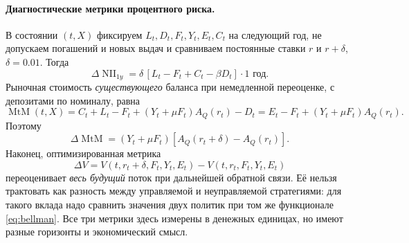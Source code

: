 \documentclass[11pt,a4paper]{article}
\newcommand{\MtM}{\operatorname{MtM}}
\newcommand{\NII}{\operatorname{NII}}
\begin{document}
\paragraph{Диагностические метрики процентного риска.}
В состоянии $(t,X)$ фиксируем $L_t,D_t,F_t,Y_t,E_t,C_t$
на следующий год, не допускаем погашений и новых выдач и
сравниваем постоянные ставки $r$ и $r+\delta$,
$\delta=0.01$. Тогда
\begin{equation}
 \Delta\NII_{1y}
 =\delta\,[L_t-F_t+C_t-\beta D_t]\cdot1\text{ год}.
 \label{eq:dnii}
\end{equation}
Рыночная стоимость \emph{существующего} баланса при немедленной
переоценке, с депозитами по номиналу, равна
\begin{equation}
 \MtM(t,X)=C_t+L_t-F_t+
       (Y_t+\mu F_t)A_Q(r_t)-D_t
       =E_t-F_t+(Y_t+\mu F_t)A_Q(r_t).
 \label{eq:mtm}
\end{equation}
Поэтому
\begin{equation}
 \Delta\MtM=(Y_t+\mu F_t)
       [A_Q(r_t+\delta)-A_Q(r_t)].
 \label{eq:dmtm}
\end{equation}
Наконец, оптимизированная метрика
\begin{equation}
 \Delta V=V(t,r_t+\delta,F_t,Y_t,E_t)
          -V(t,r_t,F_t,Y_t,E_t) \label{eq:dv}
\end{equation}
переоценивает \emph{весь будущий} поток при дальнейшей
обратной связи. Её нельзя трактовать как разность между
управляемой и неуправляемой стратегиями: для такого вклада
надо сравнить значения двух политик при том же функционале
\eqref{eq:bellman}. Все три метрики здесь измерены в денежных
единицах, но имеют разные горизонты и экономический смысл.
\end{document}
